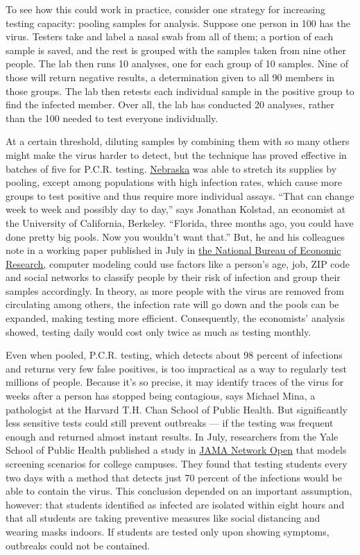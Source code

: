 To see how this could work in practice, consider one strategy for
increasing testing capacity: pooling samples for analysis. Suppose one
person in 100 has the virus. Testers take and label a nasal swab from
all of them; a portion of each sample is saved, and the rest is grouped
with the samples taken from nine other people. The lab then runs 10
analyses, one for each group of 10 samples. Nine of those will return
negative results, a determination given to all 90 members in those
groups. The lab then retests each individual sample in the positive
group to find the infected member. Over all, the lab has conducted 20
analyses, rather than the 100 needed to test everyone individually.

At a certain threshold, diluting samples by combining them with so many
others might make the virus harder to detect, but the technique has
proved effective in batches of five for P.C.R. testing.
\href{https://academic.oup.com/ajcp/article/153/6/715/5822023}{Nebraska}
was able to stretch its supplies by pooling, except among populations
with high infection rates, which cause more groups to test positive and
thus require more individual assays. ``That can change week to week and
possibly day to day,'' says Jonathan Kolstad, an economist at the
University of California, Berkeley. ``Florida, three months ago, you
could have done pretty big pools. Now you wouldn't want that.'' But, he
and his colleagues note in a working paper published in July in
\href{https://www.nber.org/papers/w27457}{the National Bureau of
Economic Research,} computer modeling could use factors like a person's
age, job, ZIP code and social networks to classify people by their risk
of infection and group their samples accordingly. In theory, as more
people with the virus are removed from circulating among others, the
infection rate will go down and the pools can be expanded, making
testing more efficient. Consequently, the economists' analysis showed,
testing daily would cost only twice as much as testing monthly.

Even when pooled, P.C.R. testing, which detects about 98 percent of
infections and returns very few false positives, is too impractical as a
way to regularly test millions of people. Because it's so precise, it
may identify traces of the virus for weeks after a person has stopped
being contagious, says Michael Mina, a pathologist at the Harvard T.H.
Chan School of Public Health. But significantly less sensitive tests
could still prevent outbreaks --- if the testing was frequent enough and
returned almost instant results. In July, researchers from the Yale
School of Public Health published a study in
\href{https://jamanetwork.com/journals/jamanetworkopen/fullarticle/2768923}{JAMA
Network Open} that models screening scenarios for college campuses. They
found that testing students every two days with a method that detects
just 70 percent of the infections would be able to contain the virus.
This conclusion depended on an important assumption, however: that
students identified as infected are isolated within eight hours and that
all students are taking preventive measures like social distancing and
wearing masks indoors. If students are tested only upon showing
symptoms, outbreaks could not be contained.

